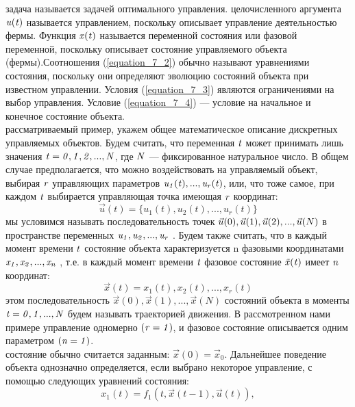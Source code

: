  задача называется задачей  оптимального управления. целочисленного аргумента $\it u(t)$ называется управлением, поскольку описывает управление деятельностью фермы. Функция $\it x(t)$ называется переменной состояния или фазовой переменной, поскольку описывает состояние управляемого объекта (фермы).Соотношения (\ref{equation_7_2}) обычно называют уравнениями состояния, поскольку они определяют эволюцию состояний объекта при известном управлении. Условия (\ref{equation_7_3}) являются ограничениями на выбор управления. Условие (\ref{equation_7_4})  — условие на начальное и конечное состояние объекта.\\
 рассматриваемый пример, укажем общее математическое описание дискретных управляемых объектов. Будем считать, что %
переменная $\it t$ может принимать лишь значения $\it t=0,1,2,...,N$, где $\it N$ — фиксированное натуральное число. В общем случае предполагается, что можно воздействовать на управляемый объект, выбирая $\it r$ управляющих параметров $\it u_1(t), ... ,u_r(t)$, или, что тоже самое, при каждом $\it t$ выбирается управляющая точка  имеющая $\it r$ координат:
\begin{equation*}
\vec{u}(t) = {\{u_1(t),u_2(t),..., u_r(t)\}}\end{equation*}
 мы условимся называть последовательность точек  $\vec{u}(0),\vec{u}\\(1),\vec{u}(2), ..., \vec{u}(N)$ в пространстве переменных $\it u_1, u_2,..., u_r$ . Будем также считать, что в каждый момент времени $\it t$ состояние объекта   характеризуется n фазовыми координатами $\it x_1 , x_2 , ..., x_n$ , т.е. в каждый момент  времени $\it t$ фазовое состояние  $\it \vec{x}(t) $  имеет $\it n$ координат:
\begin{equation*}
\vec{x}(t) = {x_1(t),x_2(t),..., x_r(t)}\end{equation*}
 этом последовательность $\vec{x}(0),\vec{x}(1),..., \vec{x}(N)$ состояний объекта в моменты $\it t=0,1,...,N$ будем называть траекторией движения. В рассмотренном нами примере управление одномерно $\it (r=1)$, и фазовое состояние описывается одним параметром $\it (n=1)$.\\
 состояние обычно считается  заданным: $\vec{x}(0)=\vec{x}_0$. Дальнейшее  поведение объекта однозначно определяется, если выбрано некоторое управление, с помощью следующих уравнений состояния:
\begin{equation}\label{equation_7_5}
x_1(t) = f_1(t,\vec{x}(t-1),\vec{u}(t)),\end{equation}
